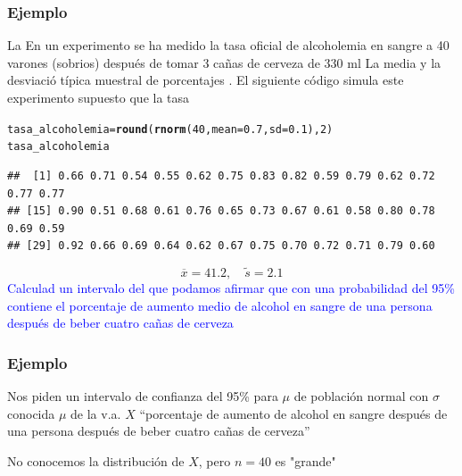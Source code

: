 \documentclass[12pt,t]{beamer}\usepackage[]{graphicx}\usepackage[]{color}
\makeatletter
\newcommand{\hlnum}[1]{\textcolor[rgb]{0.686,0.059,0.569}{#1}}%
\newcommand{\hlstd}[1]{\textcolor[rgb]{0.345,0.345,0.345}{#1}}%
\newcommand{\hlkwb}[1]{\textcolor[rgb]{0.69,0.353,0.396}{#1}}%
\newcommand{\hlkwc}[1]{\textcolor[rgb]{0.333,0.667,0.333}{#1}}%
\newcommand{\hlkwd}[1]{\textcolor[rgb]{0.737,0.353,0.396}{\textbf{#1}}}%
\newenvironment{kframe}{%
 \def\at@end@of@kframe{}%
 \ifinner\ifhmode%
  \def\at@end@of@kframe{\end{minipage}}%
  \begin{minipage}{\columnwidth}%
 \fi\fi%
 \def\FrameCommand##1{\hskip\@totalleftmargin \hskip-\fboxsep
 \colorbox{shadecolor}{##1}\hskip-\fboxsep
     \hskip-\linewidth \hskip-\@totalleftmargin \hskip\columnwidth}%
 \MakeFramed {\advance\hsize-\width
   \@totalleftmargin\z@ \linewidth\hsize
   \@setminipage}}%
 {\par\unskip\endMakeFramed%
 \at@end@of@kframe}
\newenvironment{knitrout}{}{} %
\newcommand{\blue}[1]{\textcolor{blue}{#1}}
\renewcommand{\emph}[1]{{\color{red}#1}}
\theoremstyle{plain}
\theoremstyle{definition}
\makeatother
\begin{document}
\begin{frame}
\frametitle{Ejemplo}
\vspace*{-2ex}
La 
En un experimento se ha medido la tasa oficial  de  alcoholemia en sangre a 40 varones (sobrios) después de tomar 3 cañas de cerveza de 330 ml La media  y la desviació típica muestral de  porcentajes .
El siguiente código simula este experimento supuesto que la tasa

\begin{knitrout}
\color{fgcolor}\begin{kframe}
\begin{alltt}
\hlstd{tasa_alcoholemia}\hlkwb{=}\hlkwd{round}\hlstd{(}\hlkwd{rnorm}\hlstd{(}\hlnum{40}\hlstd{,}\hlkwc{mean}\hlstd{=}\hlnum{0.7}\hlstd{,}\hlkwc{sd}\hlstd{=}\hlnum{0.1}\hlstd{),}\hlnum{2}\hlstd{)}
\hlstd{tasa_alcoholemia}
\end{alltt}
\begin{verbatim}
##  [1] 0.66 0.71 0.54 0.55 0.62 0.75 0.83 0.82 0.59 0.79 0.62 0.72 0.77 0.77
## [15] 0.90 0.51 0.68 0.61 0.76 0.65 0.73 0.67 0.61 0.58 0.80 0.78 0.69 0.59
## [29] 0.92 0.66 0.69 0.64 0.62 0.67 0.75 0.70 0.72 0.71 0.79 0.60
\end{verbatim}
\end{kframe}
\end{knitrout}



$$
\overline{x}=41.2,\quad \widetilde{s}=2.1
$$
\blue{Calculad  un intervalo del que podamos afirmar que con una probabilidad del 95\% contiene el porcentaje de aumento medio de alcohol en sangre de una persona después de beber cuatro cañas de cerveza}
\medskip

\end{frame}

\begin{frame}
\frametitle{Ejemplo}


Nos piden un \emph{intervalo de confianza  del 95\%}  para $\mu$ de población normal con $\sigma$ conocida $\mu$ de la v.a. $X$ ``porcentaje de aumento de alcohol en sangre después de una persona después de  beber cuatro cañas de cerveza''

No conocemos la distribución de  $X$, pero $n=40$ es "grande"
\end{frame}
\end{document}
